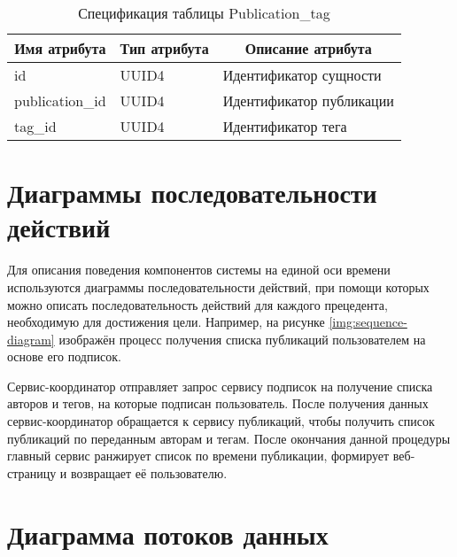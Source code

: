 \documentclass{bmstu-gost-7-32}
\begin{document}
\begin{table}[H]
	\caption{Спецификация таблицы Publication\_tag}
	\begin{tabular}{|l|l|l|}
		\hline
		\multicolumn{1}{|c|}{\textbf{Имя атрибута}} & \multicolumn{1}{c|}{\textbf{Тип атрибута}} & \multicolumn{1}{c|}{\textbf{Описание атрибута}} \\ \hline
		id                                          & UUID4                                      & Идентификатор сущности                          \\ \hline
		publication\_id                             & UUID4                                      & Идентификатор публикации                        \\ \hline
		tag\_id                                     & UUID4                                      & Идентификатор тега                              \\ \hline
	\end{tabular}
\end{table}

\section*{Диаграммы последовательности действий}

Для описания поведения компонентов системы на единой оси времени используются диаграммы последовательности действий, при помощи которых можно описать последовательность действий для каждого прецедента, необходимую для
достижения цели.
Например, на рисунке \ref{img:sequence-diagram} изображён процесс получения списка публикаций пользователем на основе его подписок.


Сервис-координатор отправляет запрос сервису подписок на получение списка авторов и тегов, на которые подписан пользователь.
После получения данных сервис-координатор обращается к сервису публикаций, чтобы получить список публикаций по переданным авторам и тегам.
После окончания данной процедуры главный сервис ранжирует список по времени публикации, формирует веб-страницу и возвращает её пользователю.

\section*{Диаграмма потоков данных}
\end{document}
